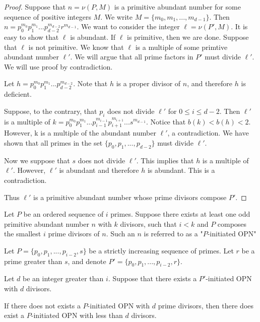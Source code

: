 \documentclass[../paper.tex]{subfiles}
\begin{document}
\begin{proof}
Suppose that $n = \nu(P,M)$ is a primitive abundant number for
some sequence of positive integers $M$. We write $M = \{ m_0,
m_1, ..., m_{d-1}\}$. Then $n = p_0^{m_0} p_1^{m_1} ... 
p_{d-2}^{m_{d-2}} r^{m_{d-1}}$. We want to consider the integer 
$\ell = \nu(P', M)$. It is easy to show that $\ell$ is abundant. 
If $\ell$ is primitive, then we are done. Suppose that $\ell$ is not
primitive. We know that $\ell$ is a multiple of some primtive
abundant number $\ell'$. We will argue that all prime factors in
$P'$ must divide $\ell'$. We will use proof by contradiction. 

Let $h = p_0^{m_0} p_1^{m_1} ... p_{d-2}^{m_{d-2}}$. Note that $h$
is a proper divisor of $n$, and therefore $h$ is deficient.

Suppose, to the contrary, that $p_i$ does not divide $\ell'$ for 
$0 \leq i \leq d-2$. Then $\ell'$ is a multiple of $k = p_0^{m_0}
p_1^{m_1} ... p_{i-1}^{m_{i-1}} p_{i+1}^{m_{i+1}} ... 
s^{m_{d-1}}$. Notice that $b(k) < b(h) < 2$. However, k is a 
multiple of the abundant number $\ell'$, a contradiction. We have
shown that all primes in the set $\{p_0, p_1, ..., p_{d-2}\}$
must divide $\ell'$.  

Now we suppose that $s$ does not divide $\ell'$. This implies
that $h$ is a multiple of $\ell'$. However, $\ell'$ is abundant 
and therefore $h$ is abundant. This is a contradiction.

Thus $\ell'$ is a primitive abundant number whose prime divisors
compose $P'$.
\end{proof}


Let $P$ be an
ordered sequence of $i$ primes. Suppose there exists at least one
odd primitive abundant number $n$ with $k$ divisors, such that $i
< k$ and $P$ composes the smallest $i$ prime divisors of $n$.
Such an $n$ is referred to as a "$P$-initiated OPN"

\begin{theorem}
\label{Divisibility}
Let $P = \{p_0, p_1, ..., p_{i-2}, s\}$ be a strictly increasing 
sequence of primes. Let $r$ be a prime greater than $s$, and 
denote $P' = \{p_0, p_1, ..., p_{i-2}, r\}$.

Let $d$ be an integer greater than $i$. 
Suppose that there exists a $P'$-initiated OPN with $d$ divisors.

If there does not exists a $P$-initiated OPN with $d$ prime
divisors, then there does exist a $P$-initiated OPN with less
than $d$ divisors.

\end{theorem}
\end{document}
